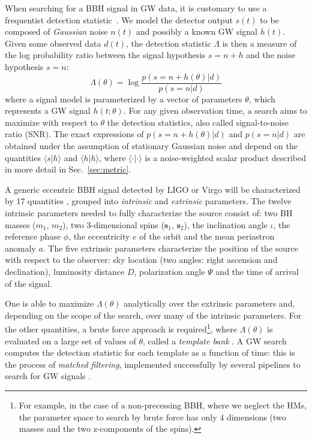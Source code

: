 \documentclass[twocolumn,showpacs,preprintnumbers,nofootinbib,prd,
superscriptaddress,10pt]{revtex4-2}
\newcommand{\scalar}[2]{\langle #1|#2 \rangle}
\begin{document}
When searching for a BBH signal in GW data, it is customary to use a frequentist detection statistic~\cite{Creighton_book, Maggiore:2007ulw, Harry:2016ijz, Harry:2017weg}.
We model the detector output $s(t)$ to be composed of {\it Gaussian} noise $n(t)$ and possibly a known GW signal $h(t)$.
Given some observed data $d(t)$, the detection statistic $\Lambda$ is then a measure of the log probability ratio between the signal hypothesis $s = n+h$ and the noise hypothesis $s = n$:
\begin{equation}\label{eq:LL}
	\Lambda(\theta) = \log\frac{p(s = n+h(\theta)|d)}{p(s = n|d)}
\end{equation}
where a signal model is parameterized by a vector of parameters $\theta$, which represents a GW signal $h(t;\theta)$.
For any given observation time, a search aims to maximize with respect to $\theta$ the detection statistics, also called signal-to-noise ratio (SNR).
The exact expressions of $p(s = n+h(\theta)|d)$ and $p(s = n|d)$ are obtained under the assumption of stationary Gaussian noise and  depend on the quantities $\scalar{s}{h}$ and $\scalar{h}{h}$, where $\scalar{\cdot}{\cdot}$ is a noise-weighted scalar product described in more detail in Sec.~\ref{sec:metric}.

A generic eccentric BBH signal detected by LIGO or Virgo will be characterized by 17 quantities \cite{Sathyaprakash_2009}, grouped into \textit{intrinsic} and \textit{extrinsic} parameters.
The twelve intrinsic parameters needed to fully characterize the source consist of: two BH masses ($m_1$, $m_2$), two 3-dimensional spins ($\mathbf{s}_1$, $\mathbf{s}_2$), the inclination angle $\iota$, the reference phase $\phi$, the eccentricity $e$ of the orbit and the mean periastron anomaly $a$.
The five extrinsic parameters characterize the position of the source with respect to the observer: sky location (two angles: right ascension and declination), luminosity distance $D$, polarization angle $\Psi$ and the time of arrival of the signal.

One is able to maximize $\Lambda(\theta)$ analytically over the extrinsic parameters and, depending on the scope of the search, over many of the intrinsic parameters.
For the other quantities, a brute force approach is required\footnote{
For example, in the case of a non-precessing BBH, where we neglect the HMs, the parameter space to search by brute force has only 4 dimensions (two masses and the two z-components of the spins).
}, where $\Lambda(\theta)$ is evaluated on a large set of values of $\theta$, called a {\it template bank} \cite{PhysRevD.77.104017, Mukherjee:2018yra}.
A GW search computes the detection statistic for each template as a function of time: this is the process of {\it matched filtering}, implemented successfully by several pipelines to search for GW signals \cite{Privitera:2013xza, Usman:2015kfa, Capano:2016dsf, PhysRevD.95.042001, gstlal_paper2, Aubin:2020goo, Chu:2020pjv}.
\end{document}
